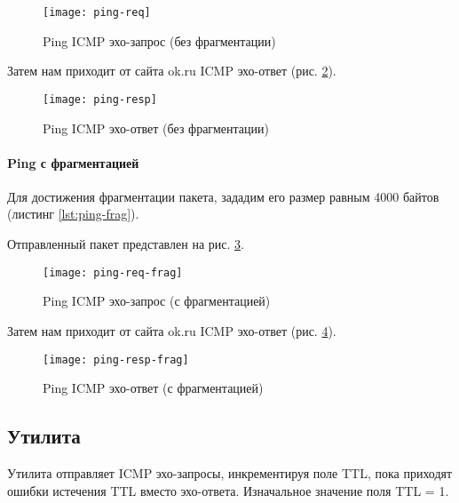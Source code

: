 

\begin{figure}[H]
	\centering
	\texttt{[image: ping-req]}
	\caption{Ping ICMP эхо-запрос (без фрагментации)}
	\label{fig:ping-req}
\end{figure}

Затем нам приходит от сайта ok.ru ICMP эхо-ответ (рис. \ref{fig:ping-resp}).

\begin{figure}[H]
	\centering
	\texttt{[image: ping-resp]}
	\caption{Ping ICMP эхо-ответ (без фрагментации)}
	\label{fig:ping-resp}
\end{figure}

\newpage

\paragraph{Ping с фрагментацией}

Для достижения фрагментации пакета, зададим его размер равным 4000 байтов (листинг \ref{lst:ping-frag}).



Отправленный пакет представлен на рис. \ref{fig:ping-req-frag}.

\begin{figure}[H]
	\centering
	\texttt{[image: ping-req-frag]}
	\caption{Ping ICMP эхо-запрос (с фрагментацией)}
	\label{fig:ping-req-frag}
\end{figure}

Затем нам приходит от сайта ok.ru ICMP эхо-ответ (рис. \ref{fig:ping-resp-frag}).

\begin{figure}[H]
	\centering
	\texttt{[image: ping-resp-frag]}
	\caption{Ping ICMP эхо-ответ (с фрагментацией)}
	\label{fig:ping-resp-frag}
\end{figure}

\subsection{Утилита }\label{sec:traceroute}

Утилита  отправляет ICMP эхо-запросы, инкрементируя поле TTL, пока приходят ошибки истечения TTL вместо эхо-ответа. Изначальное значение поля TTL = 1.


